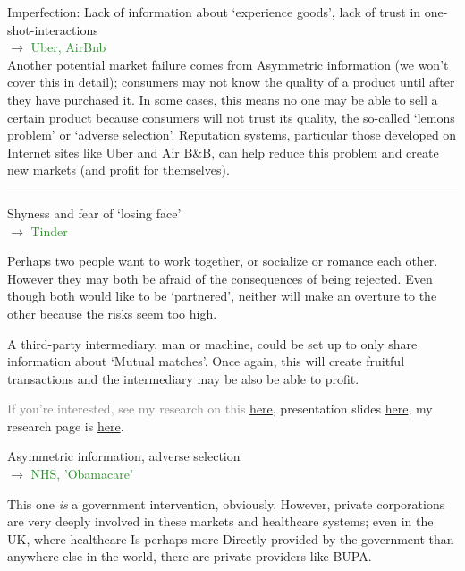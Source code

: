 \documentclass[]{article}
\begin{document}
Imperfection: Lack of information about `experience goods', lack of trust in one-shot-interactions\\

\(\rightarrow\) \textcolor{ForestGreen}{Uber, AirBnb}\\

Another potential market failure comes from Asymmetric information (we won't cover this in detail); consumers may not know the quality of a product until after they have purchased it. In some cases, this means no one may be able to sell a certain product because consumers will not trust its quality, the so-called `lemons problem' or `adverse selection'. Reputation systems, particular those developed on Internet sites like Uber and Air B\&B, can help reduce this problem and create new markets (and profit for themselves).

\begin{center}\rule{0.5\linewidth}{\linethickness}\end{center}

Shyness and fear of `losing face'\\

\(\rightarrow\) \textcolor{ForestGreen}{Tinder}

Perhaps two people want to work together, or socialize or romance each other. However they may both be afraid of the consequences of being rejected. Even though both would like to be `partnered', neither will make an overture to the other because the risks seem too high.

A third-party intermediary, man or machine, could be set up to only share information about `Mutual matches'. Once again, this will create fruitful transactions and the intermediary may be also be able to profit.

\textcolor{gray}{If you're interested, see my research on this} \href{https://www.dropbox.com/s/tx4yfun1ctxuezw/LosingFace.pdf?dl=0}{here}, presentation slides \href{http://wp.me/aZhn3-c8}{here}, my research page is \href{https://wordpress.com/page/davidreinstein.wordpress.com/18}{here}.

\bigskip

Asymmetric information, adverse selection\\

\(\rightarrow\) \textcolor{ForestGreen}{NHS, 'Obamacare'}

This one \emph{is} a government intervention, obviously. However, private corporations are very deeply involved in these markets and healthcare systems; even in the UK, where healthcare Is perhaps more Directly provided by the government than anywhere else in the world, there are private providers like BUPA.
\end{document}
